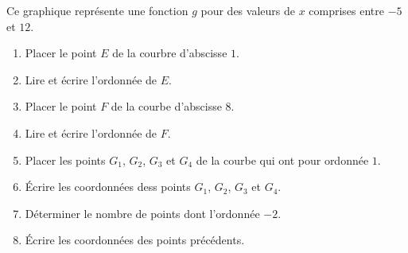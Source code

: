 \begin{exercice}
    Ce graphique représente une fonction $g$ pour des valeurs de $x$ comprises entre $-5$ et $12$.
    
    \begin{enumerate}
        \item Placer le point $E$ de la courbre d'abscisse $1$.
        \item Lire et écrire l'ordonnée de $E$.
        \item Placer le point $F$ de la courbe d'abscisse $8$.
        \item Lire et écrire l'ordonnée de $F$.
        \item Placer les points $G_1$, $G_2$, $G_3$ et $G_4$ de la courbe qui ont pour ordonnée $1$.
        \item Écrire les coordonnées dess points $G_1$, $G_2$, $G_3$ et $G_4$.
        \item Déterminer le nombre de points dont l'ordonnée $-2$.
        \item Écrire les coordonnées des points précédents.
    \end{enumerate}
\end{exercice}
